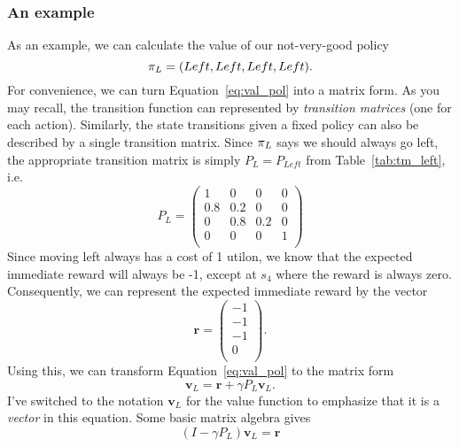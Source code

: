 \documentclass[a4paper]{article}
\begin{document}
\subsubsection{An example} \label{sssec:val_pol_example}
As an example, we can calculate the value of our not-very-good policy
\begin{equation*}
  \pi_L = (Left, Left, Left, Left) .
\end{equation*}
For convenience, we can turn Equation~\ref{eq:val_pol} into a matrix form.
As you may recall, the transition function can represented by
\emph{transition matrices} (one for each action).
Similarly, the state transitions given a fixed policy can also be described
by a single transition matrix.
Since $\pi_L$ says we should always go left, the appropriate transition
matrix is simply $P_L = P_{Left}$ from Table~\ref{tab:tm_left}, i.e.
\begin{equation*}
  P_L =
  \begin{pmatrix}
      1   & 0   & 0   & 0 \\
      0.8 & 0.2 & 0   & 0 \\
      0   & 0.8 & 0.2 & 0 \\
      0   & 0   & 0   & 1 \\
  \end{pmatrix}
\end{equation*}
Since moving left always has a cost of 1 utilon, we know that the expected
immediate reward will always be -1, except at $s_4$ where the reward
is always zero.
Consequently, we can represent the expected immediate reward by the vector
\begin{equation*}
  \mathbf{r} = \begin{pmatrix}
    -1 \\ -1 \\ -1 \\ 0 \\
  \end{pmatrix} .
\end{equation*}
Using this, we can transform Equation~\ref{eq:val_pol} to the matrix form
\begin{equation} \label{eq:val_matrix}
  \mathbf{v}_L = \mathbf{r} + \gamma P_L \mathbf{v}_L .
\end{equation}
I've switched to the notation $\mathbf{v}_L$ for the value function to
emphasize that it is a \emph{vector} in this equation.
Some basic matrix algebra gives
\begin{equation} \label{eq:val_matrix_simp}
  (I - \gamma P_L) \mathbf{v}_L = \mathbf{r}
\end{equation}
\end{document}
